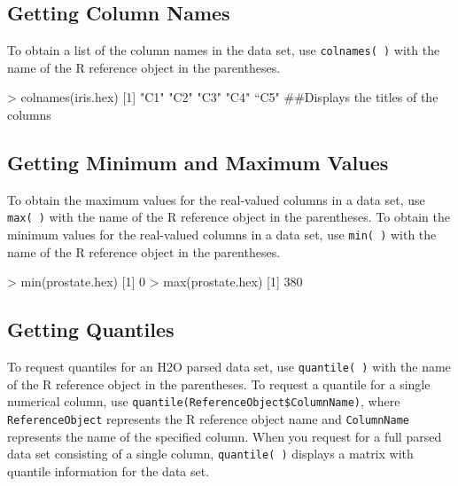 \documentclass[11pt]{article}
\begin{document}
\begin{enumerate}

\subsection{Getting Column Names}

To obtain a list of the column names in the data set, use {\texttt{colnames( )}} with the name of the R reference object in the parentheses. 

\begin{spverbatim}

> colnames(iris.hex)
[1] "C1" "C2" "C3" "C4" “C5" ##Displays the titles of the columns
\end{spverbatim}


\subsection{Getting Minimum and Maximum Values}

To obtain the maximum values for the real-valued columns in a data set, use {\texttt{max( )}} with the name of the R reference object in the parentheses. 
To obtain the minimum values for the real-valued columns in a data set, use {\texttt{min( )}} with the name of the R reference object in the parentheses. 
\begin{spverbatim}

> min(prostate.hex)
[1] 0
> max(prostate.hex)
[1] 380
\end{spverbatim}


\subsection{Getting Quantiles}

To request quantiles for an H2O parsed data set, use {\texttt{quantile( )}} with the name of the R reference object in the parentheses. 
To request a quantile for a single numerical column, use {\texttt{quantile(ReferenceObject\$ColumnName)}},  where {\texttt{ReferenceObject}} represents the R reference object name and {\texttt{ColumnName}} represents the name of the specified column. 
When you request for a full parsed data set consisting of a single column, {\texttt{quantile( )}} displays a matrix with quantile information for the data set. 


\end{enumerate}
\end{document}
